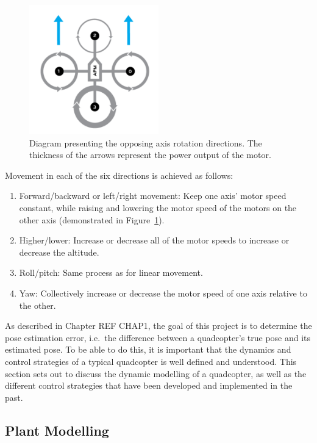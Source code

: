 \begin{figure}
  \centering
  \includegraphics[width=0.5\textwidth]{figures/chapter2/quad_axis.pdf}
  \caption[Diagram presenting the opposing axis rotations directions.]{Diagram presenting the opposing axis rotation directions. The thickness of the arrows represent the power output of the motor.~\cite{quad-rotation-pic}}
\label{fig:chap2-quad-rotation}
\end{figure}

Movement in each of the six directions is achieved as follows:

\begin{enumerate}
  \item Forward/backward or left/right movement: Keep one axis' motor speed constant, while raising and lowering the motor speed of the motors on the other axis (demonstrated in Figure~\ref{fig:chap2-quad-rotation}).
  \item Higher/lower: Increase or decrease all of the motor speeds to increase or decrease the altitude.
  \item Roll/pitch: Same process as for linear movement.
  \item Yaw: Collectively increase or decrease the motor speed of one axis relative to the other. 
\end{enumerate}

As described in Chapter REF CHAP1, the goal of this project is to determine the pose estimation error, i.e.\ the difference between a quadcopter's true pose and its estimated pose. To be able to do this, it is important that the dynamics and control strategies of a typical quadcopter is well defined and understood. This section sets out to discuss the dynamic modelling of a quadcopter, as well as the different control strategies that have been developed and implemented in the past. 

\subsection{Plant Modelling}

